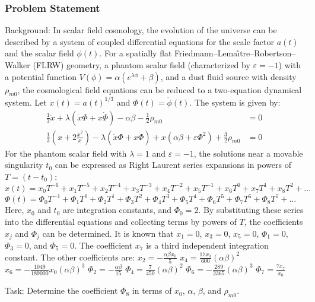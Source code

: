 \documentclass[10pt]{article}
\begin{document}
\subsubsection*{Problem Statement}
Background:
In scalar field cosmology, the evolution of the universe can be described by a system of coupled differential equations for the scale factor $a(t)$ and the scalar field $\phi(t)$. For a spatially flat Friedmann--Lema\^{\i}tre--Robertson--Walker (FLRW) geometry, a phantom scalar field (characterized by $\varepsilon = -1$) with a potential function $V(\phi) = \alpha \left( e^{\lambda \phi} + \beta \right)$, and a dust fluid source with density $\rho_{m0}$, the cosmological field equations can be reduced to a two-equation dynamical system. Let $x(t) = a(t)^{1/3}$ and $\Phi(t) = \dot{\phi}(t)$. The system is given by:
\begin{align} \label{eq:1}
\frac{1}{3}\ddot{x} + \lambda \left( \dot{x}\Phi + x\dot{\Phi} \right) - \alpha \beta - \frac{1}{2}\rho_{m0} &= 0 \\
\frac{1}{3}\left( \ddot{x} + 2\frac{\dot{x}^{2}}{x} \right) - \lambda \left( \dot{x}\Phi + x\dot{\Phi} \right) + x\left( \alpha \beta + \varepsilon \Phi^{2} \right) + \frac{3}{2}\rho_{m0} &= 0
\end{align}
For the phantom scalar field with $\lambda = 1$ and $\varepsilon = -1$, the solutions near a movable singularity $t_0$ can be expressed as Right Laurent series expansions in powers of $T = (t-t_0)$:
$x(t) = x_0 T^{-6} + x_1 T^{-5} + x_2 T^{-4} + x_3 T^{-3} + x_4 T^{-2} + x_5 T^{-1} + x_6 T^{0} + x_7 T^{1} + x_8 T^{2} + \dots$
$\Phi(t) = \Phi_0 T^{-1} + \Phi_1 T^{0} + \Phi_2 T^{1} + \Phi_3 T^{2} + \Phi_4 T^{3} + \Phi_5 T^{4} + \Phi_6 T^{5} + \Phi_7 T^{6} + \Phi_8 T^{7} + \dots$
Here, $x_0$ and $t_0$ are integration constants, and $\Phi_0 = 2$. By substituting these series into the differential equations and collecting terms by powers of $T$, the coefficients $x_j$ and $\Phi_j$ can be determined. It is known that $x_1 = 0$, $x_3 = 0$, $x_5 = 0$, $\Phi_1 = 0$, $\Phi_3 = 0$, and $\Phi_5 = 0$. The coefficient $x_7$ is a third independent integration constant. The other coefficients are:
$x_2 = -\frac{\alpha \beta x_0}{5}$
$x_4 = \frac{17x_0}{600}(\alpha \beta)^2$
$x_6 = -\frac{1049}{189000}x_0(\alpha \beta)^3$
$\Phi_2 = -\frac{\alpha \beta}{15}$
$\Phi_4 = \frac{7}{450}(\alpha \beta)^2$
$\Phi_6 = -\frac{289}{2365}(\alpha \beta)^3$
$\Phi_7 = \frac{7x_7}{x_0}$

Task: Determine the coefficient $\Phi_8$ in terms of $x_0$, $\alpha$, $\beta$, and $\rho_{m0}$.
\end{document}
